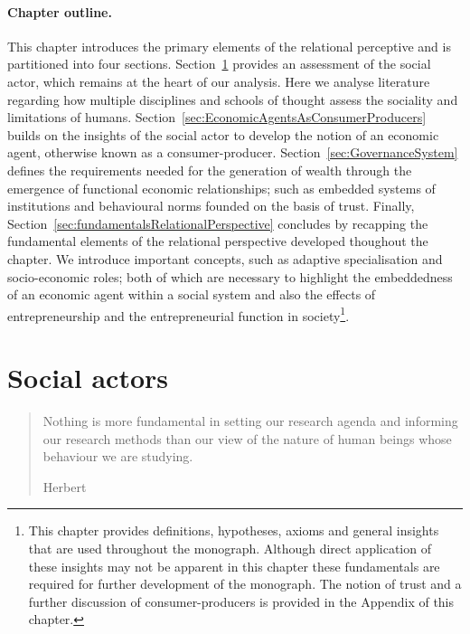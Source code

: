\paragraph{Chapter outline.}

This chapter introduces the primary elements of the relational perceptive and is partitioned into four sections. Section~\ref{sec:SocalActors} provides an assessment of the social actor, which remains at the heart of our analysis. Here we analyse literature regarding how multiple disciplines and schools of thought assess the sociality and limitations of humans. Section~\ref{sec:EconomicAgentsAsConsumerProducers} builds on the insights of the social actor to develop the notion of an economic agent, otherwise known as a consumer-producer. Section~\ref{sec:GovernanceSystem} defines the requirements needed for the generation of wealth through the emergence of functional economic relationships; such as embedded systems of institutions and behavioural norms founded on the basis of trust. Finally, Section~\ref{sec:fundamentalsRelationalPerspective} concludes by recapping the fundamental elements of the relational perspective developed thoughout the chapter. We introduce important concepts, such as adaptive specialisation and socio-economic roles; both of which are necessary to highlight the embeddedness of an economic agent within a social system and also the effects of entrepreneurship and the entrepreneurial function in society\footnote{This chapter provides definitions, hypotheses, axioms and general insights that are used throughout the monograph. Although direct application of these insights may not be apparent in this chapter these fundamentals are required for further development of the monograph. The notion of trust and a further discussion of consumer-producers is provided in the Appendix of this chapter.}.

\section{Social actors}
\label{sec:SocalActors}

\begin{quote}
Nothing is more fundamental in setting our research agenda and informing our research methods than our view of the nature of human beings whose behaviour we are studying.

\begin{flushright}
Herbert \citet[p.~303]{Simon1985}
\end{flushright}
\end{quote}

